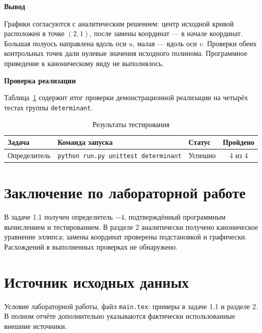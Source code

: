 \documentclass[12pt,a4paper]{article}
\newcommand{\taskhead}[1]{\par\textbf{#1}\par}
\begin{document}
\taskhead{Вывод} 

Графики согласуются с аналитическим решением:
центр исходной кривой расположен в точке $(2,1)$,
после замены координат --- в начале координат.
Большая полуось направлена вдоль оси $u$, малая --- вдоль оси $v$.
Проверки обеих контрольных точек дали нулевые значения исходного полинома.
Программное приведение к каноническому виду не выполнялось.

\taskhead{Проверка реализации}
Таблица~\ref{tab:tests} содержит итог проверки демонстрационной
реализации на четырёх тестах группы \texttt{determinant}.
\begin{table}[htbp]
\centering
\caption{Результаты тестирования}
\label{tab:tests}
\small
\begin{tabular}{|l|p{8.2cm}|l|c|}\hline
Задача & Команда запуска & Статус & Пройдено\\\hline
Определитель & \texttt{python run.py unittest determinant} & Успешно & 4 из 4\\\hline
\end{tabular}
\end{table}

\clearpage
\section*{Заключение по лабораторной работе}
В задаче 1.1 получен определитель $-4$, подтверждённый программным
вычислением и тестированием. В разделе 2 аналитически получено
каноническое уравнение эллипса; замены координат проверены подстановкой
и графически. Расхождений в выполненных проверках не обнаружено.

\section*{Источник исходных данных}
Условие лабораторной работы, файл \texttt{main.tex}: примеры
в задаче 1.1 и разделе 2. В полном отчёте дополнительно указываются
фактически использованные внешние источники.
\end{document}
